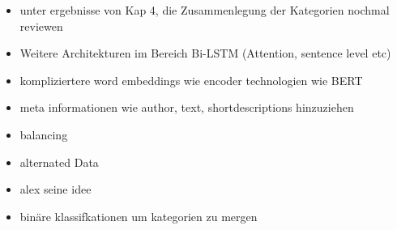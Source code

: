 \documentclass[a4paper,11pt]{article}
\begin{document}
\begin{itemize}
\item unter ergebnisse von Kap 4, die Zusammenlegung der Kategorien nochmal reviewen
    \item Weitere Architekturen im Bereich Bi-LSTM (Attention, sentence level etc)
    \item kompliziertere word embeddings wie encoder technologien wie BERT
    \item meta informationen wie author, text, shortdescriptions hinzuziehen
    \item balancing
    \item alternated Data
    \item alex seine idee
    \item binäre klassifkationen um kategorien zu mergen 
\end{itemize}


\newpage
\end{document}
